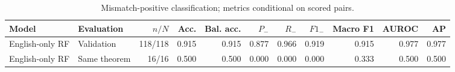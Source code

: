 \begin{table}[htbp]
\centering
\caption{Mismatch-positive classification; metrics conditional on scored pairs.}
\label{tab:english-control-metrics}
\small
\begin{adjustbox}{max width=\textwidth}
\begin{tabular}{llrrrrrrrrr}
\toprule
Model & Evaluation & $n/N$ & Acc. & Bal. acc. & $P_-$ & $R_-$ & $F1_-$ & Macro F1 & AUROC & AP \\
\midrule
English-only RF & Validation & 118/118 & 0.915 & 0.915 & 0.877 & 0.966 & 0.919 & 0.915 & 0.977 & 0.977 \\
English-only RF & Same theorem & 16/16 & 0.500 & 0.500 & 0.000 & 0.000 & 0.000 & 0.333 & 0.500 & 0.500 \\
\bottomrule
\end{tabular}
\end{adjustbox}
\end{table}
